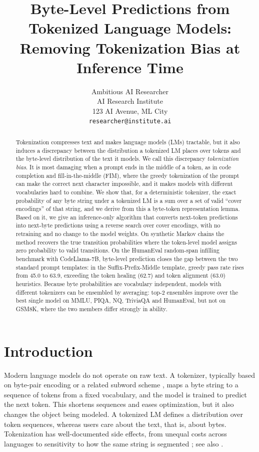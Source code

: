 \documentclass{article} %
\title{Byte-Level Predictions from Tokenized Language Models: Removing Tokenization Bias at Inference Time}
\author{Ambitious AI Researcher\\
AI Research Institute\\
123 AI Avenue, ML City\\
\texttt{researcher@institute.ai}
}
\begin{document}
\maketitle

\begin{abstract}
Tokenization compresses text and makes language models (LMs) tractable, but it also induces a discrepancy between the distribution a tokenized LM places over tokens and the byte-level distribution of the text it models. We call this discrepancy \emph{tokenization bias}. It is most damaging when a prompt ends in the middle of a token, as in code completion and fill-in-the-middle (FIM), where the greedy tokenization of the prompt can make the correct next character impossible, and it makes models with different vocabularies hard to combine. We show that, for a deterministic tokenizer, the exact probability of any byte string under a tokenized LM is a sum over a set of valid ``cover encodings'' of that string, and we derive from this a byte-token representation lemma. Based on it, we give an inference-only algorithm that converts next-token predictions into next-byte predictions using a reverse search over cover encodings, with no retraining and no change to the model weights. On synthetic Markov chains the method recovers the true transition probabilities where the token-level model assigns zero probability to valid transitions. On the HumanEval random-span infilling benchmark with CodeLlama-7B, byte-level prediction closes the gap between the two standard prompt templates: in the Suffix-Prefix-Middle template, greedy pass rate rises from 45.0 to 63.9, exceeding the token healing (62.7) and token alignment (63.0) heuristics. Because byte probabilities are vocabulary independent, models with different tokenizers can be ensembled by averaging: top-2 ensembles improve over the best single model on MMLU, PIQA, NQ, TriviaQA and HumanEval, but not on GSM8K, where the two members differ strongly in ability.
\end{abstract}

\section{Introduction}
\label{sec:intro}
Modern language models do not operate on raw text. A tokenizer, typically based on byte-pair encoding \citep{gage1994bpe,sennrich2016bpe} or a related subword scheme \citep{kudo2018sentencepiece}, maps a byte string to a sequence of tokens from a fixed vocabulary, and the model is trained to predict the next token. This shortens sequences and eases optimization, but it also changes the object being modeled. A tokenized LM defines a distribution over token sequences, whereas users care about the text, that is, about bytes. Tokenization has well-documented side effects, from unequal costs across languages \citep{petrov2023unfairness} to sensitivity to how the same string is segmented \citep{kudo2018subword,cao2021marginal}; see also \citet{mielke2021between,gastaldi2024foundations}.
\end{document}
